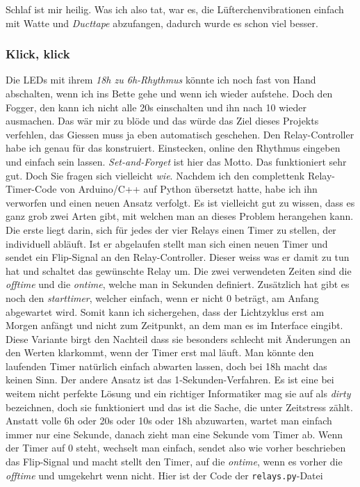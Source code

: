 \documentclass[12pt,titlepage,a4paper]{article}
\begin{document}
Schlaf ist mir heilig. Was ich also tat, war es, die Lüfterchenvibrationen einfach mit Watte und \textit{Ducttape} abzufangen, dadurch wurde es schon viel besser.

\subsubsection{Klick, klick}
Die LEDs mit ihrem \textit{18h zu 6h-Rhythmus} könnte ich noch fast von Hand abschalten, wenn ich ins Bette gehe und wenn ich wieder aufstehe. Doch den Fogger, den kann ich nicht alle 20s einschalten und ihn nach 10 wieder ausmachen. Das wär mir zu blöde und das würde das Ziel dieses Projekts verfehlen, das Giessen muss ja eben automatisch geschehen. Den Relay-Controller habe ich genau für das konstruiert. Einstecken, online den Rhythmus eingeben und einfach sein lassen. \textit{Set-and-Forget} ist hier das Motto. Das funktioniert sehr gut. Doch Sie fragen sich vielleicht \textit{wie}. Nachdem ich den complettenk Relay-Timer-Code von Arduino/C++ auf Python übersetzt hatte, habe ich ihn verworfen und einen neuen Ansatz verfolgt. Es ist vielleicht gut zu wissen, dass es ganz grob zwei Arten gibt, mit welchen man an dieses Problem herangehen kann. Die erste liegt darin, sich für jedes der vier Relays einen Timer zu stellen, der individuell abläuft. Ist er abgelaufen stellt man sich einen neuen Timer und sendet ein Flip-Signal an den Relay-Controller. Dieser weiss was er damit zu tun hat und schaltet das gewünschte Relay um. Die zwei verwendeten Zeiten sind die \textit{offtime} und die \textit{ontime}, welche man in Sekunden definiert. Zusätzlich hat gibt es noch den \textit{starttimer}, welcher einfach, wenn er nicht 0 beträgt, am Anfang abgewartet wird. Somit kann ich sichergehen, dass der Lichtzyklus erst am Morgen anfängt und nicht zum Zeitpunkt, an dem man es im Interface eingibt. Diese Variante birgt den Nachteil dass sie besonders schlecht mit Änderungen an den Werten klarkommt, wenn der Timer erst mal läuft. Man könnte den laufenden Timer natürlich einfach abwarten lassen, doch bei 18h macht das keinen Sinn. Der andere Ansatz ist das 1-Sekunden-Verfahren. Es ist eine bei weitem nicht perfekte Lösung und ein richtiger Informatiker mag sie auf als \textit{dirty} bezeichnen, doch sie funktioniert und das ist die Sache, die unter Zeitstress zählt. Anstatt volle 6h oder 20s oder 10s oder 18h abzuwarten, wartet man einfach immer nur eine Sekunde, danach zieht man eine Sekunde vom Timer ab. Wenn der Timer auf 0 steht, wechselt man einfach, sendet also wie vorher beschrieben das Flip-Signal und macht stellt den Timer, auf die \textit{ontime}, wenn es vorher die \textit{offtime} und umgekehrt wenn nicht. Hier ist der Code der \verb&relays.py&-Datei
\end{document}
